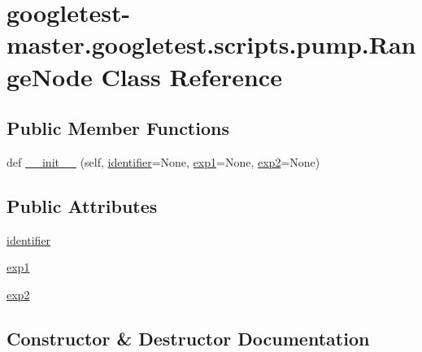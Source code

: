 \hypertarget{classgoogletest-master_1_1googletest_1_1scripts_1_1pump_1_1_range_node}{}\section{googletest-\/master.googletest.\+scripts.\+pump.\+Range\+Node Class Reference}
\label{classgoogletest-master_1_1googletest_1_1scripts_1_1pump_1_1_range_node}
\subsection*{Public Member Functions}
\begin{DoxyCompactItemize}
\item 
def \mbox{\hyperlink{classgoogletest-master_1_1googletest_1_1scripts_1_1pump_1_1_range_node_afb0f5acaab58ccd95f677123937bf774}{\+\_\+\+\_\+init\+\_\+\+\_\+}} (self, \mbox{\hyperlink{classgoogletest-master_1_1googletest_1_1scripts_1_1pump_1_1_range_node_a8d45a43acf8111c5c9584e7c89135d62}{identifier}}=None, \mbox{\hyperlink{classgoogletest-master_1_1googletest_1_1scripts_1_1pump_1_1_range_node_a35e008306a921152022d227090c98d2a}{exp1}}=None, \mbox{\hyperlink{classgoogletest-master_1_1googletest_1_1scripts_1_1pump_1_1_range_node_ab71bb1dad6313cf0a29f2f52277cbdba}{exp2}}=None)
\end{DoxyCompactItemize}
\subsection*{Public Attributes}
\begin{DoxyCompactItemize}
\item 
\mbox{\hyperlink{classgoogletest-master_1_1googletest_1_1scripts_1_1pump_1_1_range_node_a8d45a43acf8111c5c9584e7c89135d62}{identifier}}
\item 
\mbox{\hyperlink{classgoogletest-master_1_1googletest_1_1scripts_1_1pump_1_1_range_node_a35e008306a921152022d227090c98d2a}{exp1}}
\item 
\mbox{\hyperlink{classgoogletest-master_1_1googletest_1_1scripts_1_1pump_1_1_range_node_ab71bb1dad6313cf0a29f2f52277cbdba}{exp2}}
\end{DoxyCompactItemize}


\subsection{Constructor \& Destructor Documentation}
\mbox{\label{classgoogletest-master_1_1googletest_1_1scripts_1_1pump_1_1_range_node_afb0f5acaab58ccd95f677123937bf774}} 
